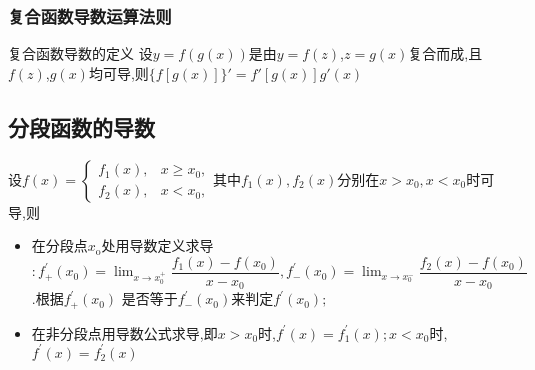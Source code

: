 \documentclass[8pt a4paper, oneside, UTF8]{ctexbook}  %
\begin{document}
\begin{sloppypar}
    \subsubsection{复合函数导数运算法则}
    \begin{defn}{复合函数导数的定义}{}
        设$y = f ( g ( x ) )$是由$y=f(z)$,$z=g(x)$复合而成,且$f(z)$,$g(x)$均可导,则$\{f[g(x)]\}'=f'[g(x)]g'(x)$
    \end{defn}
    \subsection{分段函数的导数}
    设$f(x)=\begin{cases}f_1(x),&x\geqslant x_0,\\f_2(x),&x<x_{0},\end{cases}$其中$f_1(x),f_2(x)$分别在$x>x_0,x<x_0$时可导,则
    \begin{itemize}
        \item 在分段点$x_{\mathrm{o}}$处用导数定义求导$:f_+^{\prime}(x_0)=\lim_{x\to x_0^+}\dfrac{f_1(x)-f(x_0)}{x-x_0},f_-^{\prime}(x_0)=\lim_{x\to x_0^-}\dfrac{f_2(x)-f(x_0)}{x-x_0}$ .根据$f_+^{\prime}(x_0)$ 是否等于$f_-^{\prime}(x_0)$来判定$f^{\prime}(x_0);$
        \item 在非分段点用导数公式求导,即$x>x_0$时,$f^{\prime}(x)=f_1^{\prime}(x);x<x_0$时,$f^{\prime}(x)=f_2^{\prime}(x)$
    \end{itemize}

\end{sloppypar}
\end{document}
